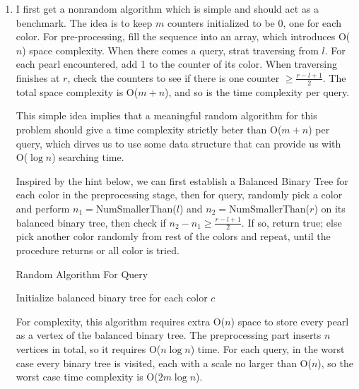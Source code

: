 \documentclass[12pt,a4paper]{article}
\makeatletter
\newtheorem*{solution}{Solution}
\theoremstyle{definition}
\renewenvironment{solution}[1][Solution] {\par\pushQED{\qed}\normalfont\topsep6\p@\@plus6\p@\relax\trivlist\item[\hskip\labelsep\bfseries#1\@addpunct{.}]\ignorespaces}{\popQED\endtrivlist\@endpefalse} \makeatother
\makeatother
\begin{document}
\begin{enumerate}
\begin{enumerate}
\begin{solution}
  I first get a nonrandom algorithm which is simple and should act as a benchmark. The idea is to keep $m$ counters initialized to be 0, one for each color. For pre-processing, fill the sequence into an array, which introduces O($n$) space complexity. When there comes a query, strat traversing from $l$. For each pearl encountered, add 1 to the counter of its color. When traversing finishes at $r$, check the counters to see if there is one counter $\geq \frac{r-l+1}{2}$. The total space complexity is O($m+n$), and so is the time complexity per query.

  This simple idea implies that a meaningful random algorithm for this problem should give a time complexity strictly beter than O($m+n$) per query, which dirves us to use some data structure that can provide us with O($\log n$) searching time. 
  
  Inspired by the hint below, we can first establish a Balanced Binary Tree for each color in the preprocessing stage, then for query, randomly pick a color and perform $n_1=$NumSmallerThan($l$) and $n_2=$NumSmallerThan($r$) on its balanced binary tree, then check if $n_2-n_1\geq \frac{r-l+1}{2}$. If so, return true; else pick another color randomly from rest of the colors and repeat, until the procedure returns or all color is tried.

  \begin{minipage}{0.8\textwidth}
    \centering
    \begin{algorithm}[H]
    \caption{Random Algorithm For Query}\label{Alg-query}
    \BlankLine
    Initialize balanced binary tree for each color $c$\;
      \;
    \end{algorithm}
    \end{minipage}

  For complexity, this algorithm requires extra O($n$) space to store every pearl as a vertex of the balanced binary tree. The preprocessing part inserts $n$ vertices in total, so it requires O($n\log n$) time. For each query, in the worst case every binary tree is visited, each with a scale no larger than O($n$), so the worst case time complexity is O($2m\log n$).


\end{solution}
\end{enumerate}
\end{enumerate}
\end{document}
